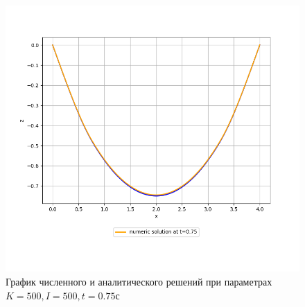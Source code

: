 {{\begin{figure}[H]
\begin{center}
			\includegraphics[width=0.7\pagewidth, height=0.4\pageheight]{plots/075_100_100}
	\caption{График численного и аналитического решений при параметрах $K=500, I=500, t = 0.75с$}
	 \end{center}
	\label{some_pic}
\end{figure}

%
%

}}
